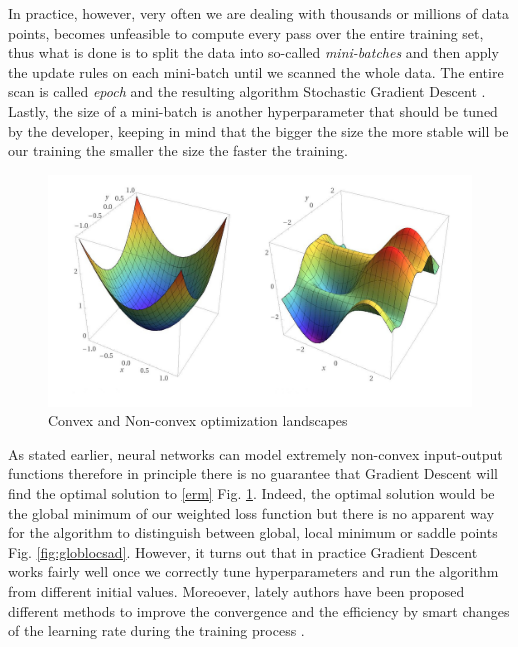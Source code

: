 \documentclass[LaM,binding=0.6cm]{./packages/sapthesis/sapthesis}
\begin{document}
            In practice, however, very often we are dealing with thousands or millions of data points, becomes unfeasible to compute every pass over
            the entire training set, thus what is done is to split the data into so-called \textit{mini-batches} and then apply the
            update rules on each mini-batch until we scanned the whole data. The entire scan is called \textit{epoch} and the 
            resulting algorithm Stochastic Gradient Descent \cite{sgd}. Lastly, the size of a mini-batch is another hyperparameter 
            that should be tuned by the developer, keeping in mind that the bigger the size the more stable will be our training
            the smaller the size the faster the training.
            \begin{figure}[h]
                \centering
                \includegraphics[scale=0.25]{conv_nonconv}
                \caption{Convex and Non-convex optimization landscapes}
                \label{fig:convnonconv}
            \end{figure}
            As stated earlier, neural networks can model extremely non-convex input-output functions therefore in principle there
            is no guarantee that Gradient Descent will find the optimal solution to \ref{erm} Fig. \ref{fig:convnonconv}.
            Indeed, the optimal solution would be the global minimum of our weighted loss function but there is no apparent
            way for the algorithm to distinguish between global, local minimum or saddle points Fig. \ref{fig:globlocsad}.
            However, it turns out that in practice Gradient Descent works fairly well once we correctly tune
            hyperparameters and run the algorithm from different initial values.
            Moreoever, lately authors have been proposed different methods to improve the convergence and the efficiency by 
            smart changes of the learning rate during the training process \cite{smith2017cyclical}. 
\end{document}
